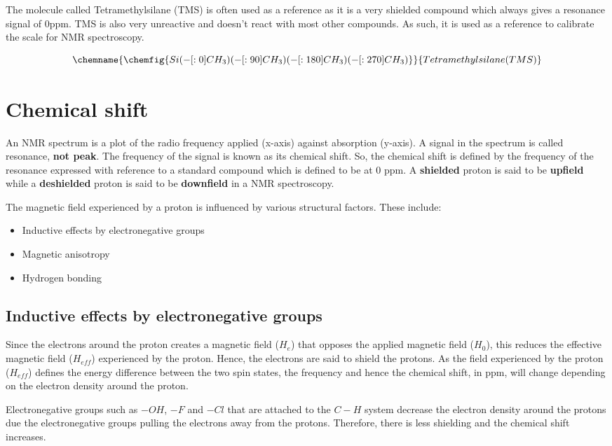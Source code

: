 \documentclass[11pt]{article}
\begin{document}
The molecule called Tetramethylsilane (TMS) is often used as a reference as it is a very shielded compound which always gives a resonance signal of 0ppm. TMS is also very unreactive and doesn't react with most other compounds. As such, it is used as a reference to calibrate the scale for NMR spectroscopy.

\[
\chemname{
\chemfig{Si(-[:0]CH_3)(-[:90]CH_3)(-[:180]CH_3)(-[:270]CH_3)}
}{Tetramethylsilane (TMS)}
\]
\section{Chemical shift}
\label{sec:org4a0a4f0}
An NMR spectrum is a plot of the radio frequency applied (x-axis) against absorption (y-axis). A signal in the spectrum is called resonance, \textbf{not peak}. The frequency of the signal is known as its chemical shift. So, the chemical shift is defined by the frequency of the resonance expressed with reference to a standard compound which is defined to be at 0 ppm. A \textbf{shielded} proton is said to be \textbf{upfield} while a \textbf{deshielded} proton is said to be \textbf{downfield} in a NMR spectroscopy.

The magnetic field experienced by a proton is influenced by various structural factors. These include:
\begin{itemize}
\item Inductive effects by electronegative groups
\item Magnetic anisotropy
\item Hydrogen bonding
\end{itemize}

\newpage
\subsection{Inductive effects by electronegative groups}
\label{sec:orge2535da}
Since the electrons around the proton creates a magnetic field (\(H_e\)) that opposes the applied magnetic field (\(H_0\)), this reduces the effective magnetic field (\(H_{eff}\)) experienced by the proton. Hence, the electrons are said to shield the protons. As the field experienced by the proton (\(H_{eff}\)) defines the energy difference between the two spin states, the frequency and hence the chemical shift, in ppm, will change depending on the electron density around the proton.

Electronegative groups such as \(-OH\), \(-F\) and \(-Cl\) that are attached to the \(C-H\) system decrease the electron density around the protons due the electronegative groups pulling the electrons away from the protons. Therefore, there is less shielding and the chemical shift increases.
\end{document}
